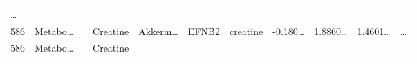 \documentclass[
]{article}
\begin{document}
\begin{longtable}[]{@{}lllllllllll@{}}
\begin{minipage}[t]{0.03\columnwidth}
\ldots{}\strut
\end{minipage}\tabularnewline
\begin{minipage}[t]{0.03\columnwidth}\raggedright
586\strut
\end{minipage} & \begin{minipage}[t]{0.07\columnwidth}\raggedright
Metabo\ldots{}\strut
\end{minipage} & \begin{minipage}[t]{0.07\columnwidth}\raggedright
\strut
\end{minipage} & \begin{minipage}[t]{0.09\columnwidth}\raggedright
Creatine\strut
\end{minipage} & \begin{minipage}[t]{0.07\columnwidth}\raggedright
Akkerm\ldots{}\strut
\end{minipage} & \begin{minipage}[t]{0.07\columnwidth}\raggedright
EFNB2\strut
\end{minipage} & \begin{minipage}[t]{0.09\columnwidth}\raggedright
creatine\strut
\end{minipage} & \begin{minipage}[t]{0.07\columnwidth}\raggedright
-0.180\ldots{}\strut
\end{minipage} & \begin{minipage}[t]{0.07\columnwidth}\raggedright
1.8860\ldots{}\strut
\end{minipage} & \begin{minipage}[t]{0.07\columnwidth}\raggedright
1.4601\ldots{}\strut
\end{minipage} & \begin{minipage}[t]{0.03\columnwidth}\raggedright
\ldots{}\strut
\end{minipage}\tabularnewline
\begin{minipage}[t]{0.03\columnwidth}\raggedright
586\strut
\end{minipage} & \begin{minipage}[t]{0.07\columnwidth}\raggedright
Metabo\ldots{}\strut
\end{minipage} & \begin{minipage}[t]{0.07\columnwidth}\raggedright
\strut
\end{minipage} & \begin{minipage}[t]{0.09\columnwidth}\raggedright
Creatine\strut
\end{minipage} & \begin{minipage}[t]{0.07\columnwidth}\raggedright

\end{minipage}
\end{longtable}
\end{document}

